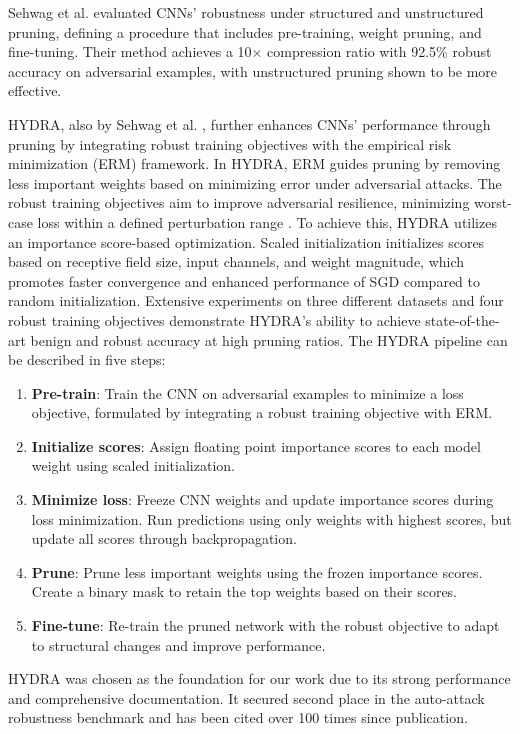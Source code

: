 \documentclass[10pt]{cai}
\begin{document}
Sehwag et al. \cite{beforehydra} evaluated CNNs' robustness under structured and unstructured pruning, defining a procedure that includes pre-training, weight pruning, and fine-tuning. Their method achieves a 10× compression ratio with 92.5\% robust accuracy on adversarial examples, with unstructured pruning shown to be more effective.

HYDRA, also by Sehwag et al. \cite{hydra}, further enhances CNNs' performance through pruning by integrating robust training objectives with the empirical risk minimization (ERM) framework. In HYDRA, ERM guides pruning by removing less important weights based on minimizing error under adversarial attacks. The robust training objectives aim to improve adversarial resilience, minimizing worst-case loss within a defined perturbation range \cite{mixtrain}. To achieve this, HYDRA utilizes an importance score-based optimization. Scaled initialization initializes scores based on receptive field size, input channels, and weight magnitude, which promotes faster convergence and enhanced performance of SGD compared to random initialization. Extensive experiments on three different datasets and four robust training objectives demonstrate HYDRA's ability to achieve state-of-the-art benign and robust accuracy at high pruning ratios. The HYDRA pipeline can be described in five steps:

\begin{enumerate}
    \item \textbf{Pre-train}: Train the CNN on adversarial examples to minimize a loss objective, formulated by integrating a robust training objective with ERM.
    \item \textbf{Initialize scores}: Assign floating point importance scores to each model weight using scaled initialization.
    \item \textbf{Minimize loss}: Freeze CNN weights and update importance scores during loss minimization. Run predictions using only weights with highest scores, but update all scores through backpropagation.
    \item \textbf{Prune}: Prune less important weights using the frozen importance scores. Create a binary mask to retain the top weights based on their scores.
    \item \textbf{Fine-tune}: Re-train the pruned network with the robust objective to adapt to structural changes and improve performance.
\end{enumerate}

HYDRA was chosen as the foundation for our work due to its strong performance and comprehensive documentation. It secured second place in the auto-attack robustness benchmark \cite{autoattack} and has been cited over 100 times since publication.
\end{document}
